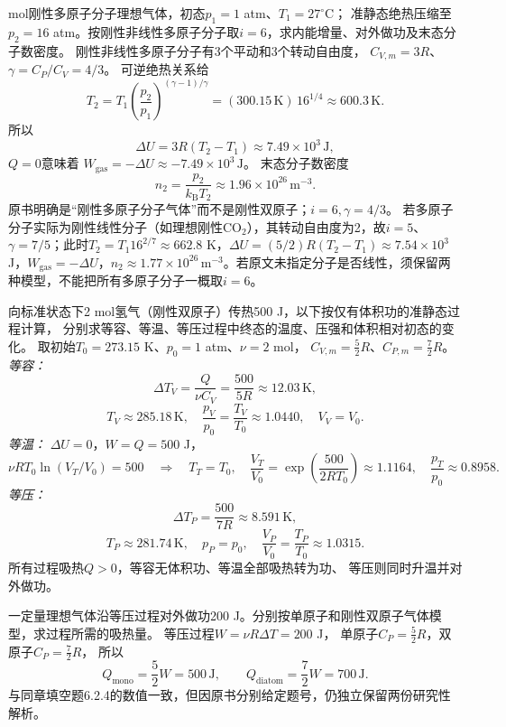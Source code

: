  mol刚性多原子分子理想气体，初态$p_1=1$ atm、$T_1=27^\circ\mathrm C$；
准静态绝热压缩至$p_2=16$ atm。按刚性非线性多原子分子取$i=6$，求内能增量、对外做功及末态分子数密度。
\workings
刚性非线性多原子分子有3个平动和3个转动自由度，
$C_{V,m}=3R$、$\gamma=C_P/C_V=4/3$。
可逆绝热关系给
\[
T_2=T_1\left(\frac{p_2}{p_1}\right)^{(\gamma-1)/\gamma}
=(300.15\,\mathrm K)\,16^{1/4}
\approx600.3\,\mathrm K.
\]
所以
\[
\boxed{\Delta U=3R(T_2-T_1)\approx7.49\times10^3\,\mathrm J},
\]
$Q=0$意味着
$\boxed{W_{\mathrm{gas}}=-\Delta U\approx-7.49\times10^3\,\mathrm J}$。
末态分子数密度
\[
\boxed{n_2=\frac{p_2}{k_{\mathrm B}T_2}
\approx1.96\times10^{26}\,\mathrm{m^{-3}}}.
\]
\crosscheck 原书明确是“刚性多原子分子气体”而不是刚性双原子；$i=6,\gamma=4/3$。
若多原子分子实际为刚性线性分子（如理想刚性CO$_2$），其转动自由度为2，故$i=5$、$\gamma=7/5$；此时$T_2=T_1 16^{2/7}\approx662.8$ K，$\Delta U=(5/2)R(T_2-T_1)\approx7.54\times10^3$ J，$W_{\mathrm{gas}}=-\Delta U$，$n_2\approx1.77\times10^{26}\,\mathrm{m^{-3}}$。若原文未指定分子是否线性，须保留两种模型，不能把所有多原子分子一概取$i=6$。

\problemtext 向标准状态下2 mol氢气（刚性双原子）传热500 J，以下按仅有体积功的准静态过程计算，
分别求等容、等温、等压过程中终态的温度、压强和体积相对初态的变化。
\workings
取初始$T_0=273.15$ K、$p_0=1$ atm、$\nu=2$ mol，
$C_{V,m}=\frac52R$、$C_{P,m}=\frac72R$。
\emph{等容：}
\[
\Delta T_V=\frac{Q}{\nu C_V}=\frac{500}{5R}\approx12.03\,\mathrm K,
\]
\[
\boxed{T_V\approx285.18\,\mathrm K,\quad
\frac{p_V}{p_0}=\frac{T_V}{T_0}\approx1.0440,\quad
V_V=V_0}.
\]
\emph{等温：} $\Delta U=0$，$W=Q=500$ J，
\[
\nu RT_0\ln(V_T/V_0)=500
\quad\Longrightarrow\quad
\boxed{T_T=T_0,\quad
\frac{V_T}{V_0}=
\exp\left(\frac{500}{2RT_0}\right)\approx1.1164,
\quad\frac{p_T}{p_0}\approx0.8958}.
\]
\emph{等压：}
\[
\Delta T_P=\frac{500}{7R}\approx8.591\,\mathrm K,
\]
\[
\boxed{T_P\approx281.74\,\mathrm K,\quad
p_P=p_0,\quad
\frac{V_P}{V_0}=\frac{T_P}{T_0}\approx1.0315}.
\]
\crosscheck 所有过程吸热$Q>0$，等容无体积功、等温全部吸热转为功、
等压则同时升温并对外做功。

\problemtext 一定量理想气体沿等压过程对外做功200 J。分别按单原子和刚性双原子气体模型，求过程所需的吸热量。
\workings
等压过程$W=\nu R\Delta T=200$ J，
单原子$C_P=\frac52R$，双原子$C_P=\frac72R$，
所以
\[
\boxed{Q_{\mathrm{mono}}=\frac52W=500\,\mathrm J},\qquad
\boxed{Q_{\mathrm{diatom}}=\frac72W=700\,\mathrm J}.
\]
\crosscheck 与同章填空题6.2.4的数值一致，但因原书分别给定题号，仍独立保留两份研究性解析。

